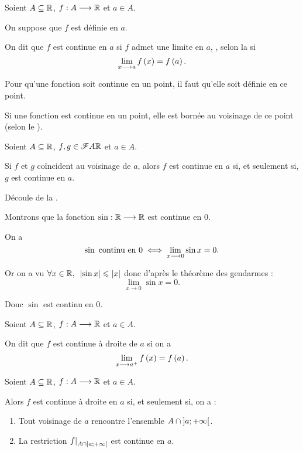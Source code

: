 \begin{defi}
Soient \(A\subseteq\mathbb{R}\), \(f:A\longrightarrow\mathbb{R}\) et \(a\in A\).

On suppose que \(f\) est définie en \(a\).

On dit que \(f\) est continue en \(a\) si \(f\) admet une limite en \(a\), \cad, selon la  si \[\lim_{x\longrightarrow a}f\left(x\right)=f\left(a\right).\]
\end{defi}

\begin{rem}
Pour qu'une fonction soit continue en un point, il faut qu'elle soit définie en ce point.

Si une fonction est continue en un point, elle est bornée au voisinage de ce point (selon le ).
\end{rem}

\begin{rem}
Soient \(A\subseteq\mathbb{R}\), \(f,g\in\mathscr{F}{A}{\mathbb{R}}\) et \(a\in A\).

Si \(f\) et \(g\) coïncident au voisinage de \(a\), alors \(f\) est continue en \(a\) si, et seulement si, \(g\) est continue en \(a\).
\end{rem}

\begin{dem}
Découle de la .
\end{dem}

\begin{ex}
Montrons que la fonction \(\sin:\mathbb{R}\longrightarrow\mathbb{R}\) est continue en \(0\).

On a \[\sin\text{ continu en }0\iff\lim_{x\longrightarrow0}\sin x=0.\]

Or on a vu \(\quantifs{\forall x\in\R}\abs{\sin x}\leq\abs{x}\) donc d'après le théorème des gendarmes : \[\lim_{x\to0}\sin x=0.\]

Donc \(\sin\) est continu en \(0\).
\end{ex}

\begin{defi}
Soient \(A\subseteq\mathbb{R}\), \(f:A\longrightarrow\mathbb{R}\) et \(a\in A\).

On dit que \(f\) est continue à droite de \(a\) si on a \[\lim_{x\longrightarrow a^+}f\left(x\right)=f\left(a\right).\]
\end{defi}

\begin{rem}[Reformulation]
Soient \(A\subseteq\mathbb{R}\), \(f:A\longrightarrow\mathbb{R}\) et \(a\in A\).

Alors \(f\) est continue à droite en \(a\) si, et seulement si, on a :

\begin{enumerate}
\item Tout voisinage de \(a\) rencontre l'ensemble \(A\cap\left]a;+\infty\right[\). \\

\item La restriction \(\restr{f}{A\inter\intervee{a}{\pinf}}\) est continue en \(a\).
\end{enumerate}
\end{rem}


